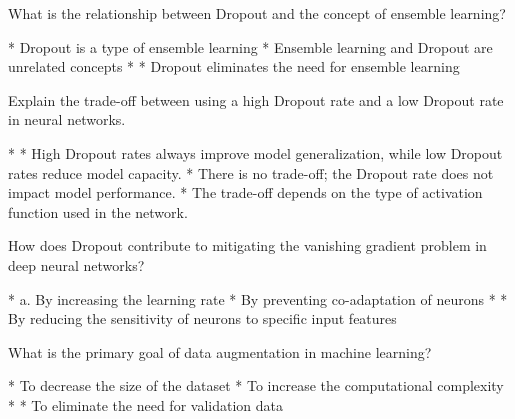 \documentclass[10pt]{extarticle}
\begin{document}
\begin{exercise}
    What is the relationship between Dropout and the concept of ensemble learning?
    \begin{choice}
        * Dropout is a type of ensemble learning
        * Ensemble learning and Dropout are unrelated concepts
        * 
        * Dropout eliminates the need for ensemble learning
    \end{choice}
\end{exercise}
\begin{solution}
\end{solution}

\begin{exercise}
    Explain the trade-off between using a high Dropout rate and a low Dropout rate in neural networks.
    \begin{choice}
        * 
        * High Dropout rates always improve model generalization, while low Dropout rates reduce model capacity.
        * There is no trade-off; the Dropout rate does not impact model performance.
        * The trade-off depends on the type of activation function used in the network.
    \end{choice}
\end{exercise}
\begin{solution}
\end{solution}

\begin{exercise}
    How does Dropout contribute to mitigating the vanishing gradient problem in deep neural networks?
    \begin{choice}
        * a. By increasing the learning rate
        * By preventing co-adaptation of neurons
        * 
        * By reducing the sensitivity of neurons to specific input features
    \end{choice}
\end{exercise}
\begin{solution}
\end{solution}

\begin{exercise}
    What is the primary goal of data augmentation in machine learning?
    \begin{choice}
        * To decrease the size of the dataset
        * To increase the computational complexity
        * 
        * To eliminate the need for validation data
    \end{choice}
\end{exercise}
\begin{solution}
\end{solution}
\end{document}
